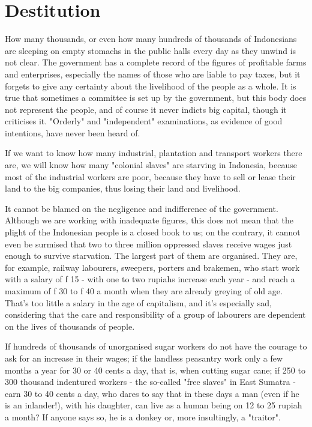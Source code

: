 \section{Destitution}

How many thousands, or even how many hundreds of thousands of Indonesians are 
sleeping on empty stomachs in the public halls every day as they unwind is not clear. 
The government has a complete record of the figures of profitable farms and enterprises, 
especially the names of those who are liable to pay taxes, but it forgets to give 
any certainty about the livelihood of the people as a whole. It is true that sometimes a 
committee is set up by the government, but this body does not represent the people, and of 
course it never indicts big capital, though it criticises it. "Orderly" and "independent" 
examinations, as evidence of good intentions, have never been heard of.\nline

If we want to know how many industrial, plantation and transport workers 
there are, we will know how many "colonial slaves" are starving in Indonesia, 
because most of the industrial workers are poor, because they have to sell or 
lease their land to the big companies, thus losing their land and livelihood.\nline

It cannot be blamed on the negligence and indifference of the government. 
Although we are working with inadequate figures, this does not mean that the 
plight of the Indonesian people is a closed book to us; on the contrary, 
it cannot even be surmised that two to three million oppressed slaves receive 
wages just enough to survive starvation. The largest part of them are organised. 
They are, for example, railway labourers, sweepers, porters and brakemen, who start 
work with a salary of f 15 - with one to two rupiahs increase each year - and 
reach a maximum of f 30 to f 40 a month when they are already greying of old age. 
That's too little a salary in the age of capitalism, and it's especially sad, considering 
that the care and responsibility of a group of labourers are dependent on the lives of thousands of people.\nline

If hundreds of thousands of unorganised sugar workers do not have the courage 
to ask for an increase in their wages; if the landless peasantry work only a 
few months a year for 30 or 40 cents a day, that is, when cutting sugar cane; 
if 250 to 300 thousand indentured workers - the so-called "free slaves" in East 
Sumatra - earn 30 to 40 cents a day, who dares to say that in these days a man 
(even if he is an inlander!), with his daughter, can live as a human being on 
12 to 25 rupiah a month? If anyone says so, he is a donkey or, more insultingly, a "traitor".\nline

